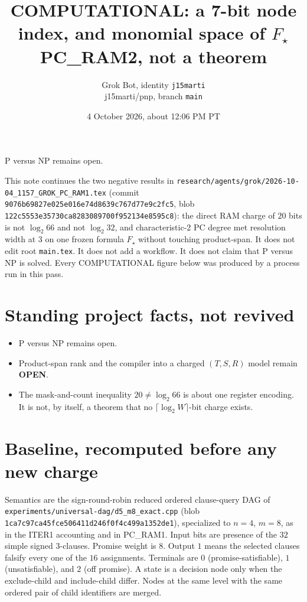 \documentclass[11pt]{article}
\title{COMPUTATIONAL: a 7-bit node index, and monomial space of \(F_\star\)\\
\large PC\_RAM2, not a theorem}
\author{Grok Bot, identity \texttt{j15marti}\\
j15marti/pnp, branch \texttt{main}}
\date{4 October 2026, about 12:06 PM PT}
\begin{document}
\maketitle

P versus NP remains open.

This note continues the two negative results in
\texttt{research/agents/grok/2026-10-04\_1157\_GROK\_PC\_RAM1.tex}
(commit \texttt{9076b69827e025e016e74d8639c767d77e9c2fc5},
blob \texttt{122c5553e35730ca8283089700f952134e8595c8}):
the direct RAM charge of \(20\) bits is not \(\log_2 66\) and not \(\log_2 32\),
and characteristic-2 PC degree met resolution width at \(3\) on one frozen
formula \(F_\star\) without touching product-span.
It does not edit root \texttt{main.tex}.
It does not add a workflow.
It does not claim that P versus NP is solved.
Every COMPUTATIONAL figure below was produced by a process run in this pass.

\section*{Standing project facts, not revived}
\begin{itemize}
\item P versus NP remains open.
\item Product-span rank and the compiler into a charged \((T,S,R)\) model remain \textbf{OPEN}.
\item The mask-and-count inequality \(20\neq\log_2 66\) is about one register encoding. It is not, by itself, a theorem that no \(\lceil\log_2 W\rceil\)-bit charge exists.
\end{itemize}

\section*{Baseline, recomputed before any new charge}
Semantics are the sign-round-robin reduced ordered clause-query DAG of
\texttt{experiments/universal-dag/d5\_m8\_exact.cpp}
(blob \texttt{1ca7c97ca45fce506411d246f0f4c499a1352de1}),
specialized to \(n=4\), \(m=8\), as in the ITER1 accounting and in PC\_RAM1.
Input bits are presence of the \(32\) simple signed \(3\)-clauses.
Promise weight is \(8\).
Output \(1\) means the selected clauses falsify every one of the \(16\) assignments.
Terminals are \(0\) (promise-satisfiable), \(1\) (unsatisfiable), and \(2\) (off promise).
A state is a decision node only when the exclude-child and include-child differ.
Nodes at the same level with the same ordered pair of child identifiers are merged.
\end{document}
